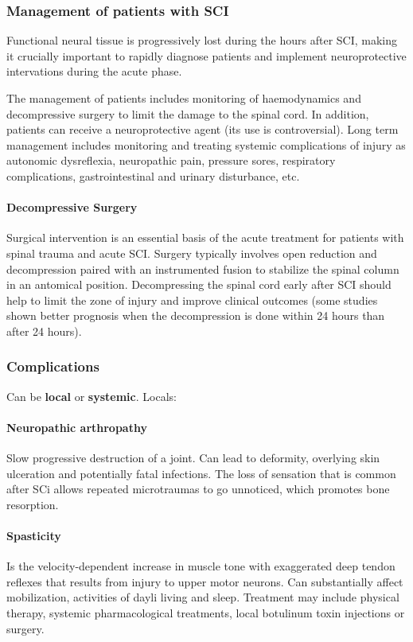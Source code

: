 \documentclass[12pt,article,oneside,a4paper]{memoir}
\begin{document}
\subsubsection{Management of patients with SCI}
Functional neural tissue is progressively lost during the hours after SCI, making it crucially important to rapidly diagnose patients and implement neuroprotective intervations during the acute phase.

The management of patients includes monitoring of haemodynamics and decompressive surgery to limit the damage to the spinal cord. In addition, patients can receive a neuroprotective agent (its use is controversial). Long term management includes monitoring and treating systemic complications of injury as autonomic dysreflexia, neuropathic pain, pressure sores, respiratory complications, gastrointestinal and urinary disturbance, etc.

\paragraph{Decompressive Surgery} Surgical intervention is an essential basis of the acute treatment for patients with spinal trauma and acute SCI. Surgery typically involves open reduction and decompression paired with an instrumented fusion to stabilize the spinal column in an antomical position. Decompressing the spinal cord early after SCI should help to limit the zone of injury and improve clinical outcomes (some studies shown better prognosis when the decompression is done within 24 hours than after 24 hours).


\subsubsection{Complications}
Can be \textbf{local} or \textbf{systemic}.
Locals:
\paragraph{Neuropathic arthropathy} Slow progressive destruction of a joint. Can lead to deformity, overlying skin ulceration and potentially fatal infections. The loss of sensation that is common after SCi allows repeated microtraumas to go unnoticed, which promotes bone resorption.

\paragraph{Spasticity} Is the velocity-dependent increase in muscle tone with exaggerated deep tendon reflexes that results from injury to upper motor neurons. Can substantially affect mobilization, activities of dayli living and sleep. Treatment may include physical therapy, systemic pharmacological treatments, local botulinum toxin injections or surgery.
\end{document}

